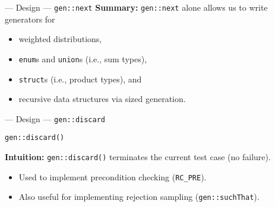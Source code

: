\begin{frame}[fragile]{\halcheck{} --- Design --- \texttt{gen::next}}
  \textbf{Summary:} \texttt{gen::next} alone allows us to write generators for
  \begin{itemize}
    \item weighted distributions,
    \item \texttt{enum}s and \texttt{union}s (i.e., sum types),
    \item \texttt{struct}s (i.e., product types), and
    \item recursive data structures via sized generation.
  \end{itemize}
\end{frame}

\begin{frame}[fragile]{\halcheck{} --- Design --- \texttt{gen::discard}}
  \begin{center}
    \texttt{gen::discard()}
  \end{center}

  \textbf{Intuition:} \texttt{gen::discard()} terminates the current test case (no failure).

  \begin{itemize}
    \item Used to implement precondition checking (\texttt{RC_PRE}).
    \item Also useful for implementing rejection sampling (\texttt{gen::suchThat}).
  \end{itemize}
\end{frame}

